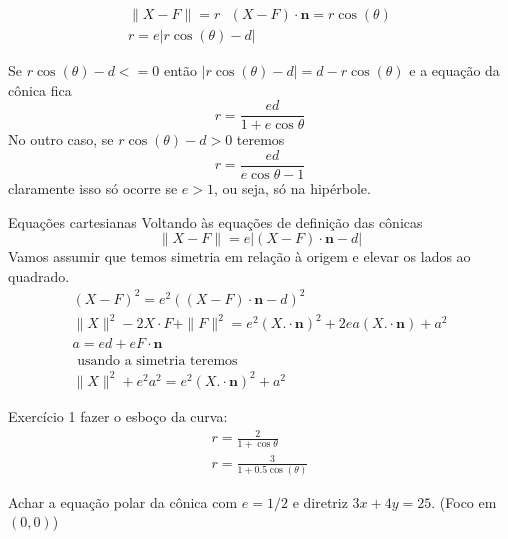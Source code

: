 \documentclass{beamer}
\begin{document}
    \begin{frame}{}
     \begin{gather*}
       \|X-F\| = r \text{ } (X-F)\cdot\mathbf{n} = r\cos(\theta)\\
       r= e|r\cos(\theta) - d|
     \end{gather*}
      
    \end{frame}
    \begin{frame}{}
      Se $r\cos(\theta)-d <=0 $ então $|r\cos(\theta)-d |=d -r\cos(\theta)$
      e a equação da cônica fica
      $$ r = \frac{ed}{1+e\cos{\theta}}$$
      No outro caso, se $r\cos(\theta)-d >0$ teremos
      $$ r= \frac{ed}{e\cos{\theta}-1}$$
      claramente isso só ocorre se $e>1$, ou seja,
      só na hipérbole. 
    \end{frame}
\begin{frame}
  
\end{frame}
\begin{frame}{Equações cartesianas} 
  Voltando às equações de definição das cônicas
  $$ \|X-F\| = e |(X-F)\cdot\mathbf{n}-d|$$ 
  Vamos assumir que temos simetria em relação à origem e elevar os lados ao quadrado.
  \begin{gather*}
    (X-F)^2 = e^2((X-F)\cdot\mathbf{n}-d)^2\\
    \|X\|^2 -2X\cdot F + \|F\|^2 = e^2(X.\cdot \mathbf{n})^2 + 2ea(X.\cdot \mathbf{n})
    + a^2\\
    a = ed + e F\cdot\mathbf{n}\\
    \text{ usando a simetria teremos} \\
    \|X\|^2 + e^2a^2 =e^2(X.\cdot \mathbf{n})^2+a^2
  \end{gather*}
\end{frame}

\begin{frame}{Exercício 1}
   fazer o esboço da curva:
   \begin{gather*}
     r= \frac{2}{1+\cos{\theta}} \\
     r = \frac{3}{1+0.5\cos(\theta)}
   \end{gather*}
  
\end{frame}
\begin{frame}
  Achar a equação polar da cônica com $e=1/2$ e diretriz $3x+4y=25.$ (Foco em $(0,0)$)
  
\end{frame}
\end{document}
